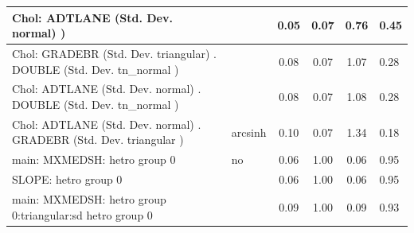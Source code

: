 \begin{table}
\begin{center}
\begin{tabular}{|l|l|c|c|c|l|}
			\hline
			 Chol: ADTLANE (Std. Dev. normal) ) &  & 0.05 & 0.07 & 0.76 & 0.45 \\
			\hline
			 Chol: GRADEBR (Std. Dev. triangular) . DOUBLE (Std. Dev.   tn_normal ) &  & 0.08 & 0.07 & 1.07 & 0.28 \\
			\hline
			 Chol: ADTLANE (Std. Dev. normal) . DOUBLE (Std. Dev.   tn_normal ) &  & 0.08 & 0.07 & 1.08 & 0.28 \\
			\hline
			 Chol: ADTLANE (Std. Dev. normal) . GRADEBR (Std. Dev.   triangular ) & arcsinh & 0.10 & 0.07 & 1.34 & 0.18 \\
			\hline
			main: MXMEDSH: hetro group 0 & no & 0.06 & 1.00 & 0.06 & 0.95 \\
			\hline
			SLOPE: hetro group 0 &  & 0.06 & 1.00 & 0.06 & 0.95 \\
			\hline
			main: MXMEDSH: hetro group 0:triangular:sd  hetro group 0 &  & 0.09 & 1.00 & 0.09 & 0.93 \\
			\hline
		\end{tabular}
	\end{center}
\end{table}